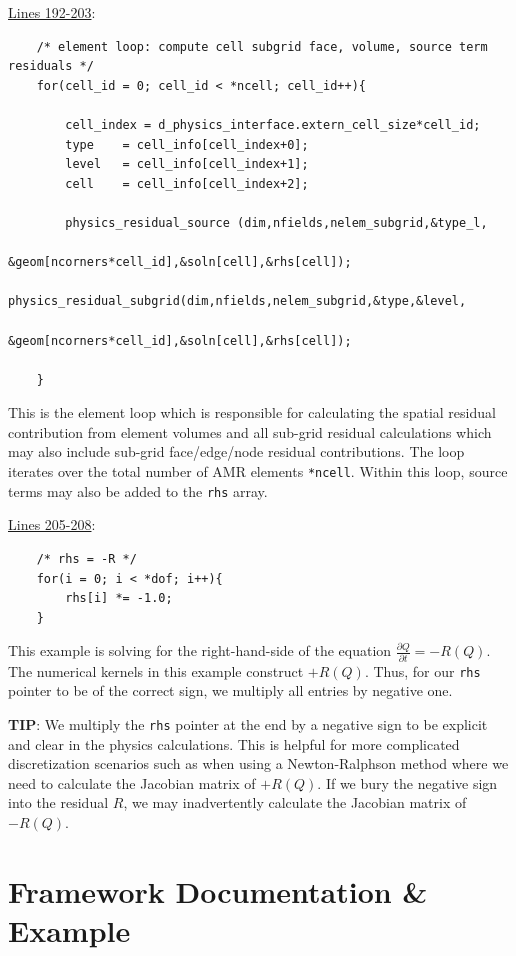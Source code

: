 \documentclass[11pt]{book}
\begin{document}
\noindent
\underline{Lines 192-203}:
\begin{verbatim}
    /* element loop: compute cell subgrid face, volume, source term residuals */
    for(cell_id = 0; cell_id < *ncell; cell_id++){
        
        cell_index = d_physics_interface.extern_cell_size*cell_id;
        type    = cell_info[cell_index+0];
        level   = cell_info[cell_index+1];
        cell    = cell_info[cell_index+2];
        
        physics_residual_source (dim,nfields,nelem_subgrid,&type_l,
                                 &geom[ncorners*cell_id],&soln[cell],&rhs[cell]);
        physics_residual_subgrid(dim,nfields,nelem_subgrid,&type,&level,
                                 &geom[ncorners*cell_id],&soln[cell],&rhs[cell]);
        
    }
\end{verbatim}
This is the element loop which is responsible for calculating the spatial residual contribution from element volumes and all sub-grid residual calculations which may also include sub-grid face/edge/node residual contributions.
The loop iterates over the total number of AMR elements \texttt{*ncell}. 
Within this loop, source terms may also be added to the \texttt{rhs} array.
\medskip

\noindent
\underline{Lines 205-208}:
\begin{verbatim}
    /* rhs = -R */
    for(i = 0; i < *dof; i++){
        rhs[i] *= -1.0;
    }
\end{verbatim}
This example is solving for the right-hand-side of the equation $\frac{\partial Q}{\partial t} = -R\left(Q\right)$. 
The numerical kernels in this example construct $+R\left(Q\right)$. Thus, for our \texttt{rhs} pointer to be of the correct sign, we multiply all entries by negative one. 
\bigskip

\noindent 
\textbf{TIP}: We multiply the \texttt{rhs} pointer at the end by a negative sign to be explicit and clear in the physics calculations. This is helpful for more complicated discretization scenarios such as when using a Newton-Ralphson method where we need to calculate the Jacobian matrix of $+R\left(Q\right)$. If we bury the negative sign into the residual $R$, we may inadvertently calculate the Jacobian matrix of $-R\left(Q\right)$.


\chapter{Framework Documentation \& Example}
\end{document}
